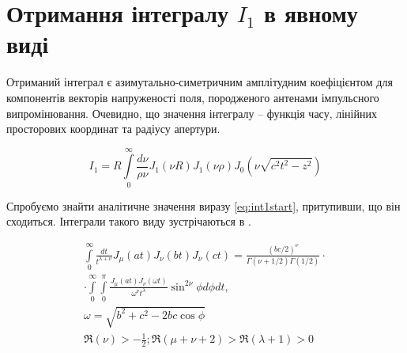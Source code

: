 \section{Отримання інтегралу $ I_1 $ в явному виді} \label{sec:i1anal}
%

Отриманий інтеграл є азимутально-симетричним амплітудним 
коефіцієнтом для компонентів векторів напруженості поля, 
породженого антенами імпульсного випромінювання. Очевидно,
що значення інтегралу -- функція часу, лінійних просторових 
координат та радіусу апертури.

\begin{equation} \label{eq:int1start}
I_1 = R \int\limits_{0}^{\infty} \frac{d\nu}{\rho \nu} 
J_1 \left( \nu R \right) J_1 \left( \nu \rho \right) 
J_0 \left( \nu \sqrt{c^2 t^2 - z^2} \right)
\end{equation}

Спробуємо знайти аналітичне значення виразу \eqref{eq:int1start}, 
притупивши, що він сходиться. Інтеграли такого виду 
зустрічаються в \cite[ст. 398]{imp:Watson1922}.

\begin{equation} \begin{aligned} \label{eq:intJJJtable}
\int\limits_{0}^{\infty} \frac{d t}{t^{\lambda + \nu}} 
J_\mu \left( at \right) J_\nu \left( bt \right) J_\nu \left( ct \right) =
\frac{ \left( bc/2 \right) ^\nu }
{ \Gamma \left( \nu + 1/2 \right) \Gamma \left( 1/2 \right) } \cdot \\
\cdot \int\limits_{0}^{\infty} \int\limits_{0}^{\pi}
\frac{J_\mu \left( at \right) J_\nu \left( \omega t \right)}
{\omega^\nu t^\lambda} \sin^{2\nu}{\phi} d\phi dt, \\
\omega = \sqrt{b^2 + c^2 - 2bc \cos \phi} \\
\Re \left( \nu \right) > - \frac{1}{2};
\Re \left( \mu + \nu + 2 \right) > \Re \left( \lambda + 1 \right) > 0
\end{aligned} \end{equation}

